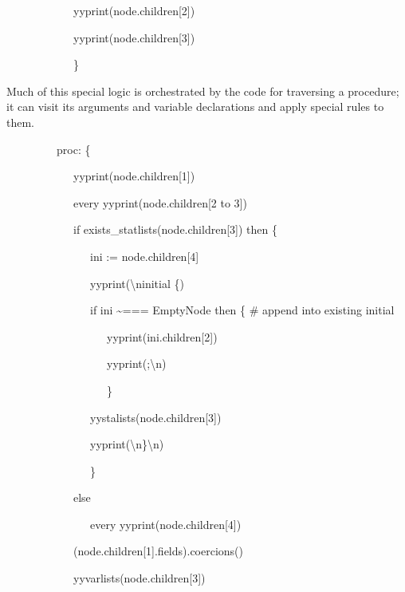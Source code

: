{\ttfamily\mdseries
\ \ \ \ \ \ \ \ \ \ \ \ yyprint(node.children[2])}

{\ttfamily\mdseries
\ \ \ \ \ \ \ \ \ \ \ \ yyprint(node.children[3])}

{\ttfamily\mdseries
\ \ \ \ \ \ \ \ \ \ \ \ \}}


Much of this special logic is orchestrated by the code for traversing
a procedure; it can visit its arguments and variable declarations and
apply special rules to them.

{\ttfamily\mdseries
\ \ \ \ \ \ \ \ \ {\textquotedbl}proc{\textquotedbl}: \{}

{\ttfamily\mdseries
\ \ \ \ \ \ \ \ \ \ \ \ yyprint(node.children[1])}

{\ttfamily\mdseries
\ \ \ \ \ \ \ \ \ \ \ \ every yyprint(node.children[2 to 3])}

{\ttfamily\mdseries
\ \ \ \ \ \ \ \ \ \ \ \ if exists\_statlists(node.children[3]) then \{}

{\ttfamily\mdseries
\ \ \ \ \ \ \ \ \ \ \ \ \ \ \ ini := node.children[4]}

{\ttfamily\mdseries
\ \ \ \ \ \ \ \ \ \ \ \ \ \ \ yyprint({\textquotedbl}{\textbackslash}ninitial \{{\textquotedbl})}

{\ttfamily\mdseries
\ \ \ \ \ \ \ \ \ \ \ \ \ \ \ if ini \~{}=== EmptyNode then \{ \# append into existing initial}

{\ttfamily\mdseries
\ \ \ \ \ \ \ \ \ \ \ \ \ \ \ \ \ \ yyprint(ini.children[2])}

{\ttfamily\mdseries
\ \ \ \ \ \ \ \ \ \ \ \ \ \ \ \ \ \ yyprint({\textquotedbl};{\textbackslash}n{\textquotedbl})}

{\ttfamily\mdseries
\ \ \ \ \ \ \ \ \ \ \ \ \ \ \ \ \ \ \}}

{\ttfamily\mdseries
\ \ \ \ \ \ \ \ \ \ \ \ \ \ \ yystalists(node.children[3])}

{\ttfamily\mdseries
\ \ \ \ \ \ \ \ \ \ \ \ \ \ \ yyprint({\textquotedbl}{\textbackslash}n\}{\textbackslash}n{\textquotedbl})}

{\ttfamily\mdseries
\ \ \ \ \ \ \ \ \ \ \ \ \ \ \ \}}

{\ttfamily\mdseries
\ \ \ \ \ \ \ \ \ \ \ \ else}

{\ttfamily\mdseries
\ \ \ \ \ \ \ \ \ \ \ \ \ \ \ every yyprint(node.children[4])}

{\ttfamily\mdseries
\ \ \ \ \ \ \ \ \ \ \ \ (node.children[1].fields).coercions()}

{\ttfamily\mdseries
\ \ \ \ \ \ \ \ \ \ \ \ yyvarlists(node.children[3])}

